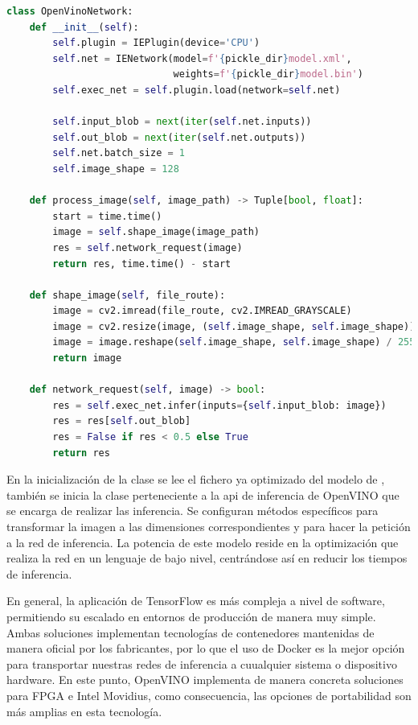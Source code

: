 \begin{lstlisting}[caption=Clase de OpenVINO de la aplicación del trabajo.,
  label=b_label,
  language=python]
    class OpenVinoNetwork:
    def __init__(self):
        self.plugin = IEPlugin(device='CPU')
        self.net = IENetwork(model=f'{pickle_dir}model.xml',
                             weights=f'{pickle_dir}model.bin')
        self.exec_net = self.plugin.load(network=self.net)

        self.input_blob = next(iter(self.net.inputs))
        self.out_blob = next(iter(self.net.outputs))
        self.net.batch_size = 1
        self.image_shape = 128

    def process_image(self, image_path) -> Tuple[bool, float]:
        start = time.time()
        image = self.shape_image(image_path)
        res = self.network_request(image)
        return res, time.time() - start

    def shape_image(self, file_route):
        image = cv2.imread(file_route, cv2.IMREAD_GRAYSCALE)
        image = cv2.resize(image, (self.image_shape, self.image_shape))
        image = image.reshape(self.image_shape, self.image_shape) / 255.0
        return image

    def network_request(self, image) -> bool:
        res = self.exec_net.infer(inputs={self.input_blob: image})
        res = res[self.out_blob]
        res = False if res < 0.5 else True
        return res
\end{lstlisting}

En la inicialización de la clase se lee el fichero ya optimizado del modelo de , también se inicia la clase
perteneciente a la api de inferencia de OpenVINO que se encarga de realizar las inferencia.
Se configuran métodos específicos para transformar la imagen a las dimensiones correspondientes y para hacer la petición a la red de inferencia.
La potencia de este modelo reside en la optimización que realiza la red en un lenguaje de bajo nivel, centrándose así en reducir los tiempos de inferencia.

En general, la aplicación de TensorFlow es más compleja a nivel de software, permitiendo su escalado en entornos de producción de manera muy simple.
Ambas soluciones implementan tecnologías de contenedores mantenidas de manera oficial por los fabricantes, por lo que el uso de Docker es la mejor opción para transportar
nuestras redes de inferencia a cuualquier sistema o dispositivo hardware.
En este punto, OpenVINO implementa de manera concreta soluciones para FPGA e Intel Movidius, como consecuencia, las opciones de portabilidad son más amplias en esta tecnología.


